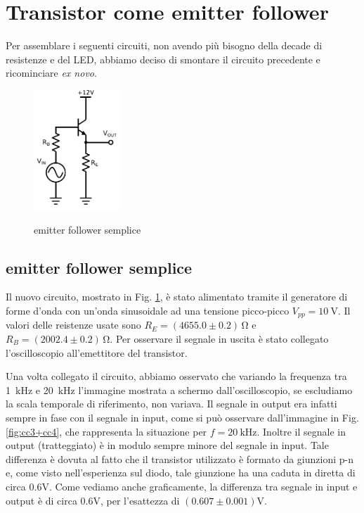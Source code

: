 \section{Transistor come emitter follower}

Per assemblare i seguenti circuiti, non avendo più bisogno della decade di resistenze e del LED, abbiamo deciso di smontare il circuito precedente e ricominciare \emph{ex novo}.

\begin{figure}
	\caption{emitter follower semplice}
	\includegraphics[height=45mm]{cc3.pdf}
	\label{fig:cc3}
\end{figure}

\subsection{emitter follower semplice}
Il nuovo circuito, mostrato in Fig. \ref{fig:cc3}, è stato alimentato tramite il generatore di forme d'onda con un'onda sinusoidale ad una tensione picco-picco $V_{pp} = \SI{10}{\volt}$.
Il valori delle reistenze usate sono $R_E = (4655.0 \pm 0.2)\,\si{\ohm}$ e $R_B = (2002.4 \pm 0.2)\,\si{\ohm}$.
Per osservare il segnale in uscita è stato collegato l'oscilloscopio all'emettitore del transistor.

Una volta collegato il circuito, abbiamo osservato che variando la frequenza tra \SI{1}{\kilo\hertz} e \SI{20}{\kilo\hertz} l'immagine mostrata a schermo dall'oscilloscopio, se escludiamo la scala temporale di riferimento, non variava.
Il segnale in output era infatti sempre in fase con il segnale in input, come si può osservare dall'immagine in Fig. \ref{fig:cc3+cc4}, che rappresenta la situazione per $f = \SI{20}{\kilo\hertz}$.
Inoltre il segnale in output (tratteggiato) è in modulo sempre minore del segnale in input.
Tale differenza è dovuta al fatto che il transistor utilizzato è formato da giunzioni p-n e, come visto nell'esperienza sul diodo, tale giunzione ha una caduta in diretta di circa $0.6\si{\volt}$. Come vediamo anche graficamente, la differenza tra segnale in input e output è di circa $0.6\si{\volt}$, per l'esattezza di $(0.607\pm0.001)\si{\volt}$.


